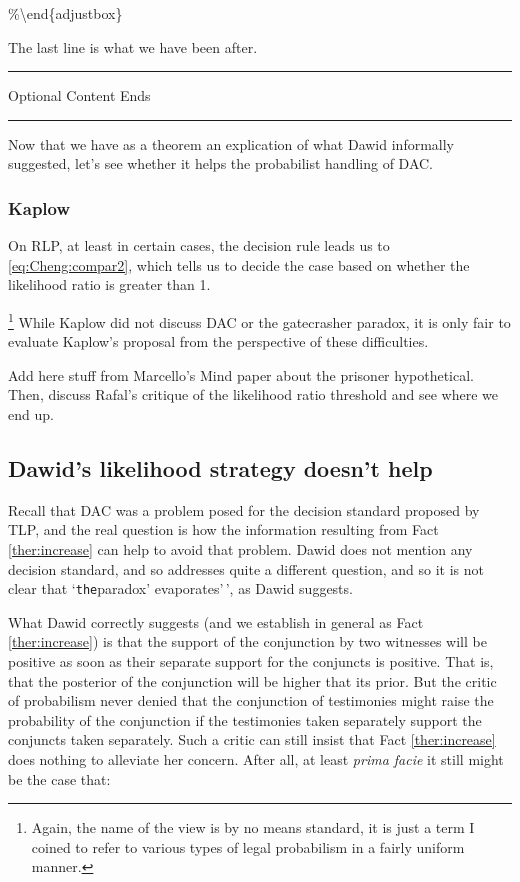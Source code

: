 \documentclass[
  10pt,
  dvipsnames,enabledeprecatedfontcommands]{scrartcl}
\newcommand{\intermezzob}{\nopagebreak 
	\begin{minipage}[c]{13cm}
	\begin{center}\rule{10cm}{0.4pt}

	\tiny{\sc Optional Content Ends}
	
	\vspace{-1mm}
	
	\rule{10cm}{0.4pt}\end{center}
	\end{minipage}
	}
\begin{document}
\%\textbackslash end\{adjustbox\}

\vspace{1mm}

The last line is what we have been after.

\intermezzob

Now that we have as a theorem an explication of what Dawid informally
suggested, let's see whether it helps the probabilist handling of DAC.

\hypertarget{kaplow-1}{%
\subsubsection{Kaplow}\label{kaplow-1}}

On RLP, at least in certain cases, the decision rule leads us to
\eqref{eq:Cheng:compar2}, which tells us to decide the case based on
whether the likelihood ratio is greater than 1.

\footnote{Again, the name of the view is by no means standard, it is  just a term I coined to refer to various types of legal probabilism in a fairly uniform manner.}
While Kaplow did not discuss DAC or the gatecrasher paradox, it is only
fair to evaluate Kaplow's proposal from the perspective of these
difficulties.

Add here stuff from Marcello's Mind paper about the prisoner
hypothetical. Then, discuss Rafal's critique of the likelihood ratio
threshold and see where we end up.

\hypertarget{dawids-likelihood-strategy-doesnt-help}{%
\subsection{Dawid's likelihood strategy doesn't
help}\label{dawids-likelihood-strategy-doesnt-help}}

Recall that DAC was a problem posed for the decision standard proposed
by TLP, and the real question is how the information resulting from Fact
\ref{ther:increase} can help to avoid that problem. Dawid does not
mention any decision standard, and so addresses quite a different
question, and so it is not clear that `\texttt{the}paradox'
evaporates'\,', as Dawid suggests.

What Dawid correctly suggests (and we establish in general as Fact
\ref{ther:increase}) is that the support of the conjunction by two
witnesses will be positive as soon as their separate support for the
conjuncts is positive. That is, that the posterior of the conjunction
will be higher that its prior. But the critic of probabilism never
denied that the conjunction of testimonies might raise the probability
of the conjunction if the testimonies taken separately support the
conjuncts taken separately. Such a critic can still insist that Fact
\ref{ther:increase} does nothing to alleviate her concern. After all, at
least \emph{prima facie} it still might be the case that:
\end{document}
